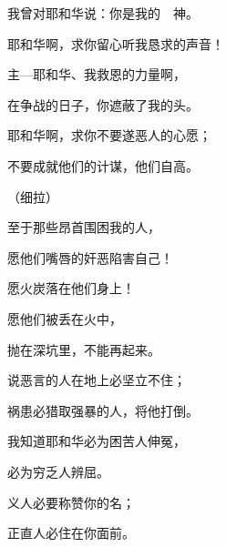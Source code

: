 {\BB \par }{\Q {}我曾对耶和华说：你是我的　神。
\par }{\Q 耶和华啊，求你留心听我恳求的声音！
\par }{\Q {}主—耶和华、我救恩的力量啊，
\par }{\Q 在争战的日子，你遮蔽了我的头。
\par }{\Q {}耶和华啊，求你不要遂恶人的心愿；
\par }{\Q 不要成就他们的计谋，{}他们自高。
\par }{\QS （细拉）
\par }
{\BB \par }{\Q {}至于那些昂首围困我的人，
\par }{\Q 愿他们嘴唇的奸恶陷害自己！
\par }{\Q {}愿火炭落在他们身上！
\par }{\Q 愿他们被丢在火中，
\par }{\Q 抛在深坑里，不能再起来。
\par }{\Q {}说恶言的人在地上必坚立不住；
\par }{\Q 祸患必猎取强暴的人，将他打倒。
\par }{\BB \par }{\Q {}我知道耶和华必为困苦人伸冤，
\par }{\Q 必为穷乏人辨屈。
\par }{\Q {}义人必要称赞你的名；
\par }{\Q 正直人必住在你面前。

}
